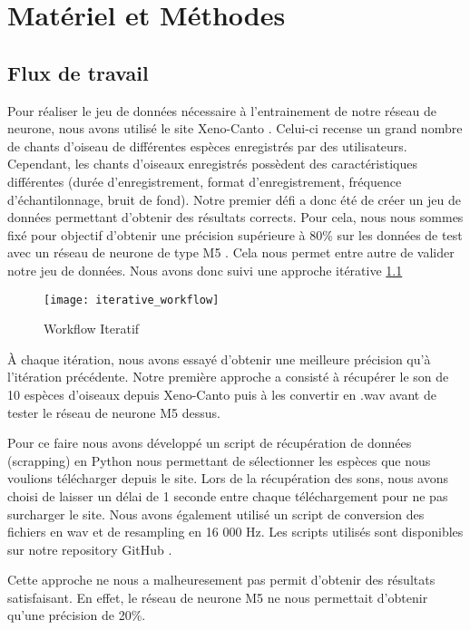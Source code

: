 \chapter{Matériel et Méthodes}

\section{Flux de travail}

Pour réaliser le jeu de données nécessaire à l'entrainement de notre réseau de neurone,
nous avons utilisé le site Xeno-Canto \cite{XenoCanto}. Celui-ci recense un grand nombre de chants d'oiseau
de différentes espèces enregistrés par des utilisateurs.
Cependant, les chants d'oiseaux enregistrés possèdent des caractéristiques différentes (durée d'enregistrement,
format d'enregistrement, fréquence d'échantilonnage, bruit de fond).
Notre premier défi a donc été de créer un jeu de données permettant 
d'obtenir des résultats corrects. 
Pour cela, nous nous sommes fixé pour objectif d'obtenir une précision supérieure à 80\% sur les données de test
avec un réseau de neurone de type M5 \cite{M5}.
Cela nous permet entre autre de valider notre jeu de données. 
Nous avons donc suivi une approche itérative \ref{graph:iterative_workflow}

\begin{figure}[!ht]
  \texttt{[image: iterative\_workflow]}
  \centering
  \caption{Workflow Iteratif}
  \label{graph:iterative_workflow}
\end{figure}

À chaque itération, nous avons essayé d'obtenir une meilleure précision qu'à l'itération précédente.
Notre première approche a consisté à récupérer le son de 10 espèces d'oiseaux depuis Xeno-Canto puis
à les convertir en .wav avant de tester le réseau de neurone M5 dessus.

Pour ce faire nous avons développé un script de récupération de données (scrapping) en Python nous permettant de sélectionner les espèces 
que nous voulions télécharger depuis le site. Lors de la récupération des sons, nous avons choisi de laisser 
un délai de 1 seconde entre chaque téléchargement pour ne pas surcharger le site. Nous avons également utilisé un script 
de conversion des fichiers en wav et de resampling en 16 000 Hz. Les scripts utilisés sont disponibles sur
notre repository GitHub  \cite{Repository}.

Cette approche ne nous a malheuresement pas permit d'obtenir des résultats satisfaisant. En effet, 
le réseau de neurone M5 ne nous permettait d'obtenir qu'une précision de 20\%.

